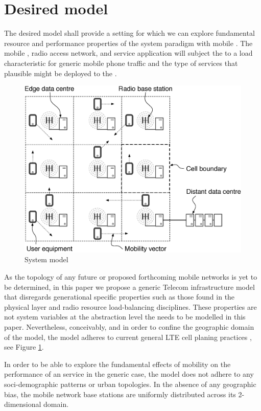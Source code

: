 \section{Desired model}
\label{sec:desiard_model}

The desired model shall provide a setting for which we can explore fundamental resource and performance properties of the \xcloud{} system paradigm with mobile \ues{}. The mobile \ues{}, radio access network, and service application will subject the \dcs{} to a load characteristic for generic mobile phone traffic and the type of services that plausible might be deployed to the \xcloud{}.

\begin{figure}[tb]
	\centering
	\includegraphics[width=\linewidth]{fig_system_model.eps} 
	\caption{System model}
	\label{fig:system_model}
\end{figure}

As the topology of any future \xcloud{} or proposed forthcoming mobile networks is yet to be determined, in this paper we propose a generic Telecom infrastructure model that disregards generational specific properties such as those found in the physical layer and radio resource load-balancing disciplines. These properties are not system variables at the abstraction level the \xcloud{} needs to be modelled in this paper. Nevertheless, conceivably, and in order to confine the geographic domain of the model, the model adheres to current general LTE cell planing practices \cite{salo2010practical}, see Figure \ref{fig:system_model}.

In order to be able to explore the fundamental effects of mobility on the performance of an \xcloud{} service in the generic case, the model does not adhere to any soci-demographic patterns or urban topologies. In the absence of any geographic bias, the mobile network base stations are uniformly distributed across its 2-dimensional domain.

